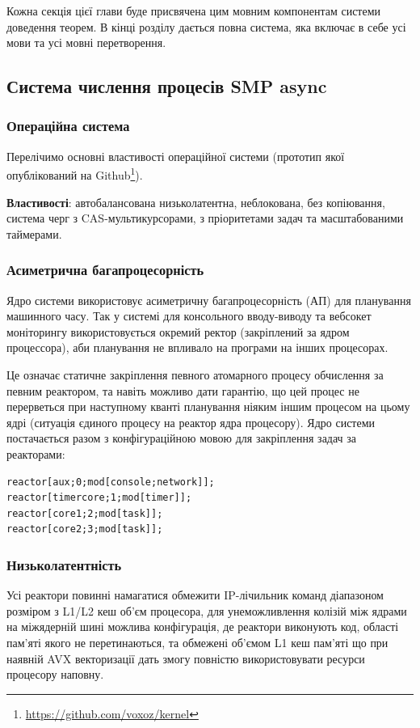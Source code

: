 \documentclass{article}
\begin{document}
Кожна секція цієї глави буде присвячена цим мовним компонентам
системи доведення теорем. В кінці розділу дається повна система, яка включає в себе усі
мови та усі мовні перетворення.

\subsection{Система числення процесів SMP async}

\subsubsection{Операційна система}
Перелічимо основні властивості операційної системи (прототип
якої опублікований на Github\footnote{\url{https://github.com/voxoz/kernel}}).

\textbf{Властивості}: автобалансована низьколатентна, неблокована, без копіювання, система черг
з CAS-мультикурсорами, з пріоритетами задач та масштабованими таймерами.

\subsubsection{Асиметрична багапроцесорність}
Ядро системи використовує асиметричну багапроцесорність (АП)
для планування машинного часу. Так у системі для консольного
вводу-виводу та вебсокет моніторингу використовується окремий
ректор (закріплений за ядром процессора),
аби планування не впливало на програми на інших процесорах.

\newpage
Це означає статичне закріплення певного атомарного процесу
обчислення за певним реактором, та навіть можливо дати гарантію, що
цей процес не перерветься при наступному кванті планування
ніяким іншим процесом на цьому ядрі (ситуація єдиного процесу
на реактор ядра процесору). Ядро системи постачається разом з конфігураційною
мовою для закріплення задач за реакторами:

\begin{lstlisting}
reactor[aux;0;mod[console;network]];
reactor[timercore;1;mod[timer]];
reactor[core1;2;mod[task]];
reactor[core2;3;mod[task]];
\end{lstlisting}

\subsubsection{Низьколатентність}
Усі реактори повинні намагатися обмежити IP-лічильник команд
діапазоном розміром з L1/L2 кеш об'єм процесора, для унеможливлення
колізій між ядрами на міжядерній шині можлива конфігурація, де
реактори виконують код, області пам'яті якого не перетинаються,
та обмежені об'ємом L1 кеш пам'яті що при наявній AVX векторизації
дать змогу повністю використовувати ресурси процесору наповну.
\end{document}
